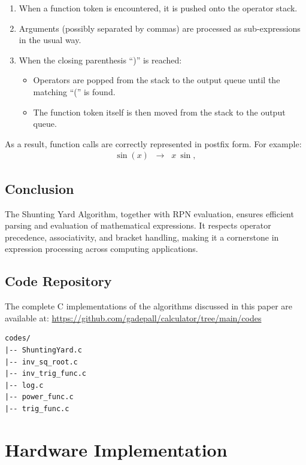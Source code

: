\documentclass[conference]{IEEEtran}
\begin{document}
\begin{enumerate}
    \item When a function token is encountered, it is pushed onto the operator stack.
    \item Arguments (possibly separated by commas) are processed as sub-expressions in the usual way.
    \item When the closing parenthesis ``)'' is reached:
    \begin{itemize}
        \item Operators are popped from the stack to the output queue until the matching ``('' is found.
        \item The function token itself is then moved from the stack to the output queue.
    \end{itemize}
\end{enumerate}

As a result, function calls are correctly represented in postfix form. For example:
\begin{align}
\sin(x) \;\;\rightarrow\;\; x \ \sin, 
\end{align}


\subsection{Conclusion}
The Shunting Yard Algorithm, together with RPN evaluation, ensures efficient parsing and evaluation of mathematical expressions. It respects operator precedence, associativity, and bracket handling, making it a cornerstone in expression processing across computing applications.

\subsection{Code Repository}
The complete C implementations of the algorithms discussed in this paper are available at: \url{https://github.com/gadepall/calculator/tree/main/codes}


\begin{lstlisting}[caption={Repository Structure in codes/}]
codes/
|-- ShuntingYard.c
|-- inv_sq_root.c
|-- inv_trig_func.c
|-- log.c
|-- power_func.c
|-- trig_func.c
\end{lstlisting}


\section{Hardware Implementation}
\end{document}
